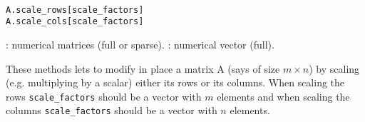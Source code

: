 \begin{mandesc}
  \\ 
\end{mandesc}
\begin{calling_sequence}
\begin{verbatim}
A.scale_rows[scale_factors]
A.scale_cols[scale_factors]
\end{verbatim}
\end{calling_sequence}
\begin{parameters}
  \begin{varlist}
    : numerical matrices (full or sparse).
    : numerical vector (full).
  \end{varlist}
\end{parameters}

\begin{mandescription}

These methods lets to modify in place a matrix A (says of size $m \times n$) by scaling 
(e.g. multiplying by a scalar) either its rows or its columns. When scaling the rows 
\verb+scale_factors+ should be a vector with $m$ elements and when scaling the columns
 \verb+scale_factors+ should be a vector with $n$ elements.

\end{mandescription}


\begin{examples}
\begin{program}
\end{program} 

\end{examples}

\begin{manseealso}
\end{manseealso}


